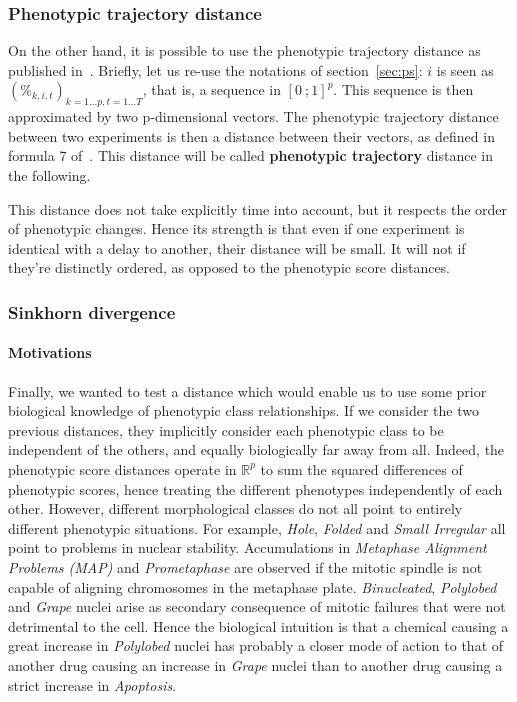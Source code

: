 \subsubsection{Phenotypic trajectory distance}
On the other hand, it is possible to use the phenotypic trajectory distance as published in~\cite{Walter2010}. Briefly, let us re-use the notations of section~\ref{sec:ps}: $i$ is seen as $(\%_{k,i,t})_{k=1\ldots p,t=1\ldots T}$, that is, a sequence in $[0~;1]^p$. This sequence is then approximated by two p-dimensional vectors. The phenotypic trajectory distance between two experiments is then a distance between their vectors, as defined in formula 7 of~\cite{Walter2010}. This distance will be called \textbf{phenotypic trajectory} distance in the following.

This distance does not take explicitly time into account, but it respects the order of phenotypic changes. Hence its strength is that even if one experiment is identical with a delay to another, their distance will be small. It will not if they're distinctly ordered, as opposed to the phenotypic score distances.

\subsubsection{Sinkhorn divergence}
\paragraph*{Motivations\\}
Finally, we wanted to test a distance which would enable us to use
some prior biological knowledge of phenotypic class relationships. If
we consider the two previous distances, they implicitly consider each
phenotypic class to be independent of the others, and equally
biologically far away from all. Indeed, the phenotypic score distances
operate in $\mathbb{R}^p$ to sum the squared differences of phenotypic
scores, hence treating the different phenotypes independently of
each other. However, different morphological classes do not all point
to entirely different phenotypic situations. For example,
\textit{Hole}, \textit{Folded} and \textit{Small Irregular} all point
to problems in nuclear stability. Accumulations in \textit{Metaphase Alignment Problems
  (MAP)} and \textit{Prometaphase} are observed if the mitotic spindle
is not capable of aligning chromosomes in the metaphase plate. 
\textit{Binucleated}, \textit{Polylobed} and \textit{Grape} nuclei arise as secondary consequence of mitotic failures that were not detrimental to the cell. %
Hence the biological intuition is that a chemical
causing a great increase in \textit{Polylobed} nuclei has probably a
closer mode of action to that of another drug causing an increase in \textit{Grape} nuclei than to another drug causing
a strict increase in \textit{Apoptosis}. 

